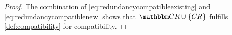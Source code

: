 \begin{proof}
    The combination of \autoref{eq:redundancycompatibleexisting} and \autoref{eq:redundancycompatiblenew} shows that $\consistencyrelationset{CR} \cup \setted{\consistencyrelation{CR}{}}$ fulfills \autoref{def:compatibility} for compatibility.
\end{proof}

